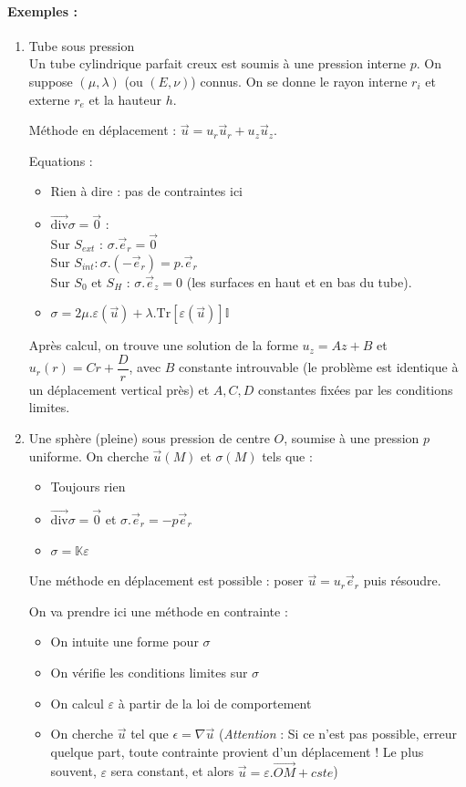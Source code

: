 \documentclass{article}
\begin{document}
\paragraph{Exemples :}
\begin{enumerate}
\item Tube sous pression\\
Un tube cylindrique parfait creux est soumis à une pression interne $p$. On suppose $(\mu,\lambda)$ (ou $(E,\nu)$) connus. On se donne le rayon interne $r_i$ et externe $r_e$ et la hauteur $h$.

Méthode en déplacement : $\vec{u} = u_r \vec{u}_r + u_z \vec{u}_z$.

Equations :
\begin{itemize}[label=$\star$]
\item Rien à dire : pas de contraintes ici
\item $\overrightarrow{\text{div}} \sigma = \vec{0}$ :\\
Sur $S_{ext}$ : $\sigma.\vec{e}_r=\vec{0}$\\
Sur $S_{int}:\sigma.(-\vec{e}_r)=p.\vec{e}_r$\\
Sur $S_0$ et $S_H$ : $\sigma.\vec{e}_z=0$ (les surfaces en haut et en bas du tube).
\item $\sigma = 2\mu.\varepsilon(\vec{u})+\lambda.\text{Tr}[\varepsilon(\vec{u})]\mathbb{I}$
\end{itemize}

Après calcul, on trouve une solution de la forme $u_z = Az+B$ et $u_r(r) = Cr + \dfrac{D}{r}$, avec $B$ constante introuvable (le problème est identique à un déplacement vertical près) et $A,C,D$ constantes fixées par les conditions limites.

\item Une sphère (pleine) sous pression de centre $O$, soumise à une pression $p$ uniforme. On cherche $\vec{u}(M)$ et $\sigma(M)$ tels que :
\begin{itemize}[label=$\star$]
\item Toujours rien
\item $\overrightarrow{\text{div}} \sigma = \vec{0}$ et $\sigma . \vec{e}_r = -p \vec{e}_r$
\item $\sigma = \mathbb{K} \varepsilon$
\end{itemize}

Une méthode en déplacement est possible : poser $\vec{u} = u_r \vec{e}_r$ puis résoudre.

On va prendre ici une méthode en contrainte :
\begin{itemize}
\item On intuite une forme pour $\sigma$
\item On vérifie les conditions limites sur $\sigma$
\item On calcul $\varepsilon$ à partir de la loi de comportement
\item On cherche $\vec{u}$ tel que $\epsilon = \nabla \vec{u}$ (\emph{Attention} : Si ce n'est pas possible, erreur quelque part, toute contrainte provient d'un déplacement ! Le plus souvent, $\varepsilon$ sera constant, et alors $\vec{u} = \varepsilon.\overrightarrow{OM}+cste$)
\end{itemize}
\bigskip


\end{enumerate}
\end{document}
